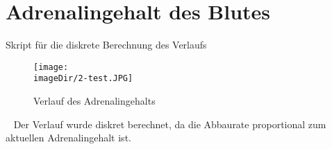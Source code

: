\section{Adrenalingehalt des Blutes}
\begin{code}
	\caption{Skript für die diskrete Berechnung des Verlaufs}
	\label{source:2-script}
\end{code}
\begin{figure}[h]
\centering
\texttt{[image: \\imageDir/2-test.JPG]}
\caption{Verlauf des Adrenalingehalts}
\label{fig:1-c-modell}
\end{figure}
\ \newline
Der Verlauf wurde diskret berechnet, da die Abbaurate proportional zum aktuellen Adrenalingehalt ist.